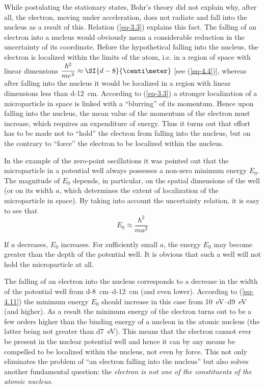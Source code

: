 \documentclass[a4paper,sfsidenotes,colorlinks=true]{tufte-book}
\numberwithin{equation}{section}
\numberwithin{figure}{section}
\begin{document}
While postulating the stationary states, Bohr's theory did not explain why,
after all, the electron, moving under acceleration, does not radiate
and fall into the nucleus as a result of this. Relation (\ref{eq-3.3})
explains this fact. The falling of an electron into a nucleus would
obviously mean a considerable reduction in the uncertainty of its
coordinate. Before the hypothetical falling into the nucleus, the
electron is localized within the limits of the atom, i.e. in a region
of space with linear dimensions $\dfrac{\hbar^{2}}{me^{2}} \approx
  \SI{d-8}{\centi\meter}$ [see (\ref{eq-4.4})], whereas after falling
  into the nucleus it would be localized in a region with linear
  dimensions less than \SI{d-12}{\centi\meter}. According to
  (\ref{eq-3.3}) a stronger localization of a microparticle in space
  is linked with a ``blurring'' of its momentum. Hence upon falling into
  the nucleus, the mean value of the momentum of the electron must
  increase, which requires an expenditure of energy. Thus it turns
  out that effort has to be made not to ``hold'' the electron from
  falling into the nucleus, but on the contrary to ``force'' the electron to be
  localized within the nucleus. 

  In the example of the zero-point oscillations it was pointed out
  that the microparticle in a potential well always possesses a
  non-zero minimum energy $E_{0}$. The magnitude of $E_{0}$ depends, in
  particular, on the spatial dimensions of the well (or on its width
  $a$, which determines the extent of localization of the microparticle
  in space). By taking into account the uncertainty relation, it is
  easy to see that 
  \begin{equation}%
    E_{0} \approx \frac{\hbar^{2}}{ma^{2}}
    \label{eq-4.11}
  \end{equation}
  
  If $a$ decreases, $E_{0}$ increases. For sufficiently small $a$, the
  energy $E_{0}$ may become greater than the depth of the potential
  well. It is obvious that such a well will not hold the microparticle
  at all.  

  The falling of an electron into the nucleus corresponds to a
  decrease in the width of the potential well from
  \SIrange{d-8}{d-12}{\centi\meter} (and even lower). According to
  (\ref{eq-4.11}) the minimum energy $E_{0}$ should increase in this
  case from \SIrange{10}{d9}{\electronvolt} (and higher). As a result
  the minimum energy of the electron turns out to be a few orders
  higher than the binding energy of a nucleon in the atomic nucleus
  (the latter being not greater than \SI{d7}{\electronvolt}). This
  means that the electron cannot ever be present in the nuclear
  potential well and hence it can by any means be compelled to be
  localized within the nucleus, not even by force. This not only
  eliminates the problem of ``an electron falling into the nucleus''
  but also solves another fundamental question: the \emph{electron is not
  one of the constituents of the atomic nucleus}.
\end{document}
